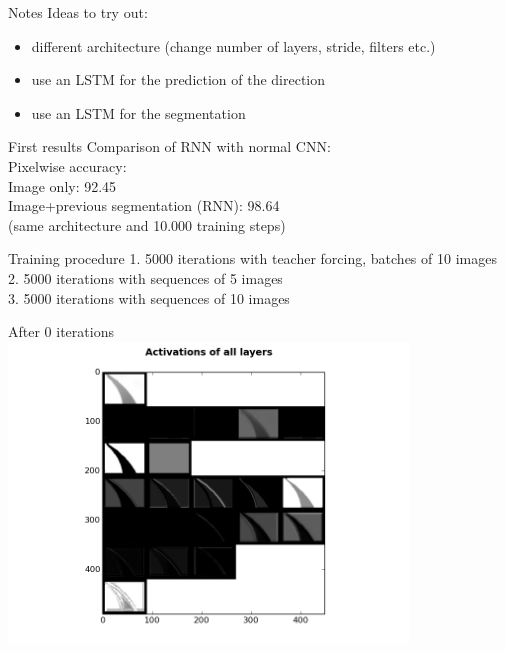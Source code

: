 \begin{frame}[beamer:0]{Notes}
Ideas to try out:
\begin{itemize}
\item different architecture (change number of layers, stride, filters etc.)
\item use an LSTM for the prediction of the direction
\item use an LSTM for the segmentation
\end{itemize}
\end{frame}

\begin{frame}{First results}
Comparison of RNN with normal CNN:\\
Pixelwise accuracy:\\
Image only: 92.45 \\
Image+previous segmentation (RNN): 98.64 \\
(same architecture and 10.000 training steps)
\end{frame}

\begin{frame}{Training procedure}
1. 5000 iterations with teacher forcing, batches of 10 images\\
2. 5000 iterations with sequences of 5 images\\
3. 5000 iterations with sequences of 10 images\\
\end{frame}

\begin{frame}{After 0 iterations}
\includegraphics[height=8.0cm]{data/activations/output-0.png}\\ 
\end{frame}

